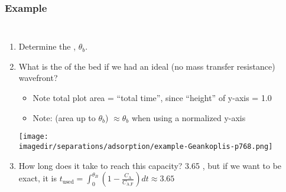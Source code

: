 \begin{frame}\frametitle{Example}
	\vspace{-12pt}
	\begin{columns}[t]
		\begin{enumerate}
			\item	Determine the {\color{purple}{breakpoint time}}, $\theta_b$. \pause \iftoggle{instructor}{[{\color{myOrange}{Ans: 3.65 hours}}]}{}		
			\item	What is the {\color{purple}{usable capacity}} of the bed if we had an ideal (no mass transfer resistance) wavefront? \pause \iftoggle{instructor}{[{\color{myOrange}{Ans:}} the fractional area of $A_1$ = 3.65 / 6.9 = {\color{orange}{53\%}}]}{}
			\pause
				\begin{itemize}
					\item	Note total plot area = ``total time'', since ``height'' of y-axis = 1.0
					\item	Note: (area up to $\theta_b$) $\approx \theta_b$  when using a normalized y-axis
				\end{itemize}
			\vspace{-8pt}
			\begin{center}
				\texttt{[image: \\imagedir/separations/adsorption/example-Geankoplis-p768.png]}
			\end{center}
			\vspace{-12pt}
			\item	How long does it take to reach this capacity? 3.65 , but if we want to be exact, it is $t_\text{used} = \displaystyle \int_0^{\theta_B}{\left(1-\frac{C_\text{A}}{C_\text{A,F}} \right)dt} \approx 3.65$
		\end{enumerate}
	\end{columns}	
\end{frame}

